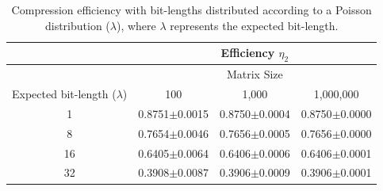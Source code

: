 \documentclass[10pt]{article}
\begin{document}
\begin{table}[h]
  \centering
  \caption{Compression efficiency with bit-lengths distributed according to a 
Poisson distribution ($\lambda$), where $\lambda$ represents the expected 
bit-length.}
  \begin{tabular}{cccc}
      \hline
      &&Efficiency $\eta_2$      & \\
      \hline
      &&Matrix Size& \\
      Expected bit-length ($\lambda$)	& 100	& 1,000	& 1,000,000 \\
      \hline
      1	& 0.8751$\pm$0.0015 	& 0.8750$\pm$0.0004 & 0.8750$\pm$0.0000 \\ 
      8	& 0.7654$\pm$0.0046 	& 0.7656$\pm$0.0005 & 0.7656$\pm$0.0000 \\ 
      16 & 0.6405$\pm$0.0064 	& 0.6406$\pm$0.0006 & 0.6406$\pm$0.0001 \\ 
      32 & 0.3908$\pm$0.0087 	& 0.3906$\pm$0.0009 & 0.3906$\pm$0.0001 \\ 
      \hline
  \end{tabular}
  \label{tab:06}
\end{table}
\end{document}
